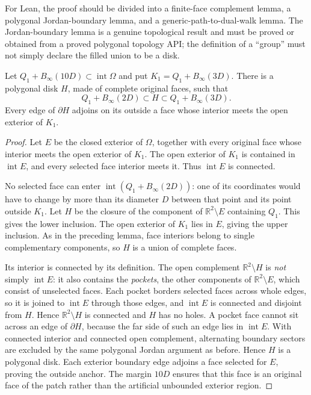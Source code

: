 For Lean, the proof should be divided into a finite-face complement lemma,
a polygonal Jordan-boundary lemma, and a generic-path-to-dual-walk lemma.
The Jordan-boundary lemma is a genuine topological result and must be proved
or obtained from a proved polygonal topology API; the definition of a
``group'' must not simply declare the filled union to be a disk.

\begin{lemma}
\label{lem:outside-grouping}
Let $Q_1+B_\infty(10D)\subset\operatorname{int}\Omega$ and put
$K_1=Q_1+B_\infty(3D)$.  There is a polygonal disk $H$, made of complete
original faces, such that
\[
 Q_1+B_\infty(2D)\subset H\subset Q_1+B_\infty(3D).
\]
Every edge of $\partial H$ adjoins on its outside a face whose interior
meets the open exterior of $K_1$.
\end{lemma}

\begin{proof}
Let $E$ be the closed exterior of $\Omega$, together with every original
face whose interior meets the open exterior of $K_1$.  The open exterior
of $K_1$ is contained in $\operatorname{int}E$, and every selected face
interior meets it.  Thus $\operatorname{int}E$ is connected.

No selected face can enter $\operatorname{int}(Q_1+B_\infty(2D))$:
one of its coordinates would have to change by more than its diameter $D$
between that point and its point outside $K_1$.  Let $H$ be the closure of
the component of $\mathbb R^2\setminus E$ containing $Q_1$.  This gives
the lower inclusion.  The open exterior of $K_1$ lies in $E$, giving the
upper inclusion.  As in the preceding lemma, face interiors belong to
single complementary components, so $H$ is a union of complete faces.

Its interior is connected by its definition.  The open complement
$\mathbb R^2\setminus H$ is \emph{not} simply $\operatorname{int}E$: it
also contains the \emph{pockets}, the other components of
$\mathbb R^2\setminus E$, which consist of unselected faces.  Each pocket
borders selected faces across whole edges, so it is joined to
$\operatorname{int}E$ through those edges, and $\operatorname{int}E$ is
connected and disjoint from $H$.  Hence $\mathbb R^2\setminus H$ is
connected and $H$ has no holes.  A pocket face cannot sit across an edge
of $\partial H$, because the far side of such an edge lies in
$\operatorname{int}E$.  With connected interior and connected open
complement, alternating boundary sectors are excluded by the same
polygonal Jordan argument as before.  Hence $H$ is a polygonal disk.  Each exterior
boundary edge adjoins a face selected for $E$, proving the outside anchor.
The margin $10D$ ensures that this face is an original face of the patch
rather than the artificial unbounded exterior region.
\end{proof}

